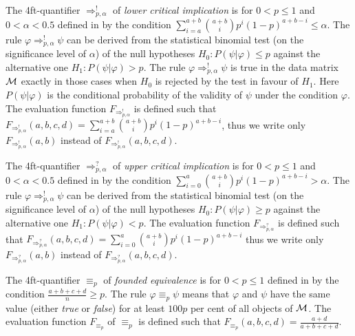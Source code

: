 The 4ft-quantifier $ \Rightarrow^{!}_{p, \alpha} $ of
 {\it lower critical implication} is for  $ 0 < p \leq 1 $ and 
 $ 0 < \alpha < 0.5$ defined in \cite{Ha:78} by the condition
$   \sum_{i = a}^{a + b} {a+b \choose i}
          p^{i} (1 - p)^{a+b-i} \leq \alpha $.
The rule $\varphi \Rightarrow^{!}_{p, \alpha}  \psi $ can be derived 
from the statistical binomial test (on the significance level of $ \alpha $)
of the null hypotheses $H_{0}: P(\psi | \varphi ) \leq p $ 
 against the  alternative  one  $H_{1}: P(\psi | \varphi ) > p $. 
The rule  $\varphi \Rightarrow^{!}_{p, \alpha}  \psi $ is true in the 
data matrix ${\cal M }$ exactly in those cases when $H_{0}$
is rejected by the test in favour of $H_{1}$. 
Here $ P(\psi | \varphi ) $  is  the conditional probability of the
validity  of $ \psi$  under the condition $ \varphi $.
The evaluation function $ F_{\Rightarrow^{!}_{p, \alpha}}$ %
is defined such that 
$ F_{\Rightarrow^{!}_{p, \alpha}}(a,b,c,d) = \sum_{i = a}^{a + b} {a+b \choose i}
          p^{i} (1 - p)^{a+b-i} $, thus we write only 
$ F_{\Rightarrow^{!}_{p, \alpha}}(a,b)$ instead of $ F_{\Rightarrow^{!}_{p, \alpha}}(a,b,c,d)$.


The 4ft-quantifier $ \Rightarrow^{?}_{p, \alpha} $ of
 {\it upper critical implication} is for  $ 0 < p \leq 1 $ and 
 $ 0 < \alpha < 0.5$ defined in \cite{Ha:78} by the condition
$   \sum_{i = 0}^{a} {a+b \choose i}
          p^{i} (1 - p)^{a+b-i} > \alpha $.
The rule $\varphi \Rightarrow^{!}_{p, \alpha}  \psi $ can be derived 
from the statistical binomial test (on the significance level of $ \alpha $)
of the null hypotheses $H_{0}: P(\psi | \varphi ) \geq p $ 
 against the  alternative  one  $H_{1}: P(\psi | \varphi ) < p $. 
The evaluation function $ F_{\Rightarrow^{?}_{p, \alpha}}$ %
is defined such that 
$ F_{\Rightarrow^{?}_{p, \alpha}}(a,b,c,d) =    \sum_{i = 0}^{a} {a+b \choose i}  p^{i} (1 - p)^{a+b-i} $
          thus we write only 
$ F_{\Rightarrow^{?}_{p, \alpha}}(a,b)$ instead of $ F_{\Rightarrow^{?}_{p, \alpha}}(a,b,c,d)$.


The 4ft-quantifier $ \equiv_{p} $ of {\it founded
equivalence \/} is for $ 0 < p \leq 1 $   
defined in \cite{Ha:83} by the condition
$ \frac{a+b+c+d}{n} \geq p $. 
The rule $\varphi \equiv_{p}  \psi $   means that $\varphi$ and $\psi$ have the same value (either
{\it true} or {\it false}) for at least $100p$ per cent of all
objects of ${\cal M }$. 
The evaluation function $ F_{\equiv_{p}}$
of $\equiv_{p}$ is defined such that 
$ F_{\equiv_{p}}(a,b,c,d) = \frac{a+d}{a+b+c+d} $.

